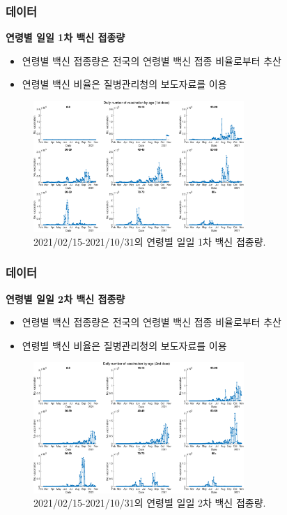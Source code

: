 \documentclass[aspectratio=169, 9pt, xcolor=dvipsnames]{beamer}
\begin{document}
	\begin{frame}\frametitle{데이터}
	    \textbf{연령별 일일 1차 백신 접종량}
	    \begin{itemize}
	    	\item 연령별 백신 접종량은 전국의 연령별 백신 접종 비율로부터 추산
	    	\item 연령별 백신 비율은 질병관리청의 보도자료를 이용
	    \end{itemize}
	    \begin{figure}
	    	\centering
	    	\includegraphics[width=8cm]{../results/data/vaccine_number_by_age_1st.eps}
	    	\caption{2021/02/15-2021/10/31의 연령별 일일 1차 백신 접종량.}
	    \end{figure}
	\end{frame}

	\begin{frame}\frametitle{데이터}
	    \textbf{연령별 일일 2차 백신 접종량}
	    \begin{itemize}
	    	\item 연령별 백신 접종량은 전국의 연령별 백신 접종 비율로부터 추산
	    	\item 연령별 백신 비율은 질병관리청의 보도자료를 이용
	    \end{itemize}
	    \begin{figure}
	    	\centering
	    	\includegraphics[width=8cm]{../results/data/vaccine_number_by_age_2nd.eps}
	    	\caption{2021/02/15-2021/10/31의 연령별 일일 2차 백신 접종량.}
	    \end{figure}
	\end{frame}
\end{document}
